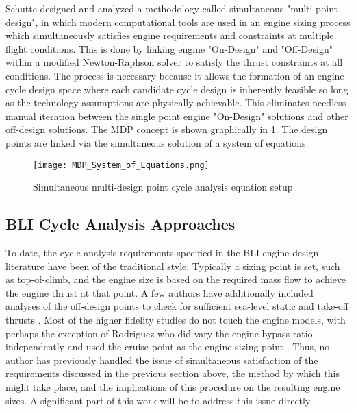 \indent Schutte \cite{SchutteThesis} designed and analyzed a methodology called simultaneous "multi-point design", in which modern computational tools are used in an engine sizing process which simultaneously satisfies engine requirements and constraints at multiple flight conditions.  This is done by linking engine "On-Design" and "Off-Design" within a modified Newton-Raphson solver to satisfy the thrust constraints at all conditions.  The process is necessary because it allows the formation of an engine cycle design space where each candidate cycle design is inherently feasible so long as the technology assumptions are physically achievable.  This eliminates needless manual iteration between the single point engine "On-Design" solutions and other off-design solutions.  The MDP concept is shown graphically in \ref{MDP_System_of_Equations}.  The design points are linked via the simultaneous solution of a system of equations.

	\begin{figure}[htpb]
	\centering
	\texttt{[image: MDP\_System\_of\_Equations.png]}
	\caption{Simultaneous multi-design point cycle analysis equation setup \cite{SchutteThesis}}
	\label{MDP_System_of_Equations}
	\end{figure}

\subsection{BLI Cycle Analysis Approaches}
\indent To date, the cycle analysis requirements specified in the BLI engine design literature have been of the traditional style.  Typically a sizing point is set, such as top-of-climb, and the engine size is based on the required mass flow to achieve the engine thrust at that point.  A few authors have additionally included analyses of the off-design points to check for sufficient sea-level static and take-off thrusts \cite{Felder2011} \cite{Sato2011}.  Most of the higher fidelity studies do not touch the engine models, with perhaps the exception of Rodriguez who did vary the engine bypass ratio independently and used the cruise point as the engine sizing point \cite{RodriguezThesis} \cite{Rodriguez2009}.  Thus, no author has previously handled the issue of simultaneous satisfaction of the requirements discussed in the previous section above, the method by which this might take place, and the implications of this procedure on the resulting engine sizes.  A significant part of this work will be to address this issue directly.

